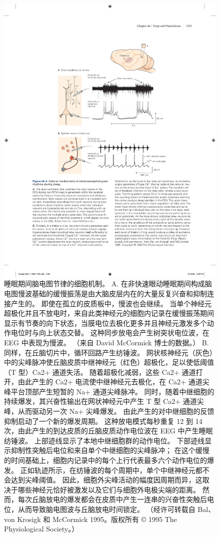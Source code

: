 \begin{figure}[htbp]
	\centering
	\includegraphics[width=0.9\linewidth]{chap44/fig_44_2}
	\caption{睡眠期间脑电图节律的细胞机制。 A. 在非快速眼动睡眠期间构成脑电图慢波基础的缓慢振荡是由大脑皮层内在的大量反复兴奋和抑制连接产生的。 即使在孤立的皮质板中，慢波也会继续。 当单个神经元超极化并且不放电时，来自此类神经元的细胞内记录在缓慢振荡期间显示有节奏的向下状态，当膜电位去极化更多并且神经元激发多个动作电位时与向上状态交替。 这种同步放电会产生树突状电位波，在 EEG 中表现为慢波。 （来自 David McCormick 博士的数据。） B. 同样，在丘脑切片中，循环回路产生纺锤波。 网状核神经元（灰色）中的尖峰脉冲使丘脑皮质中继神经元（红色）超极化，足以使低阈值（T 型）Ca2+ 通道失活。 随着超极化减弱，这些 Ca2+ 通道打开，由此产生的 Ca2+ 电流使中继神经元去极化，在 Ca2+ 通道尖峰平台顶部产生短暂的 Na+ 通道尖峰脉冲。 同时，随着中继细胞的持续爆发，其兴奋性输出在网状神经元中产生 T 型 Ca2+ 通道尖峰，从而驱动另一次 Na+ 尖峰爆发。 由此产生的对中继细胞的反馈抑制启动了一个新的爆发周期。 这种放电模式每秒重复 12 到 14 次，由此产生的到达皮质的丘脑皮质动作电位波在 EEG 中产生睡眠纺锤波。 上部迹线显示了本地中继细胞群的动作电位。 下部迹线显示抑制性突触后电位和来自单个中继细胞的尖峰脉冲； 在这个缓慢的时间基础上，细胞内记录中的每个上行代表最多六个动作电位的爆发。 正如轨迹所示，在纺锤波的每个周期中，单个中继神经元都不会达到尖峰阈值。 因此，细胞外尖峰活动的幅度因周期而异，这取决于哪些神经元恰好被激发以及它们与细胞外电极尖端的距离。 然而，每次丘脑放电的爆发都会在皮质中产生一连串的兴奋性突触后电位，从而导致脑电图波与丘脑放电时间锁定。 （经许可转载自 Bal、von Krosigk 和 McCormick 1995。版权所有 © 1995 The Physiological Society。）}
	\label{fig:44_2}
\end{figure}

